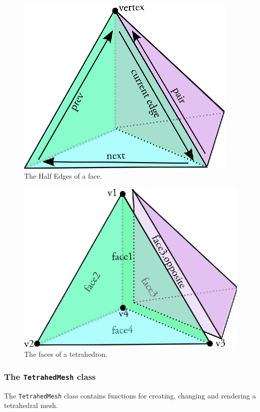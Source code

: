 \documentclass[10pt,a4paper]{article}
\begin{document}
\begin{figure}[htbp]
\label{fig:tetraedge}
\begin{center}
\includegraphics[scale=1]{figures/tetra_edge.eps} 
\caption{The Half Edges of a face.}
\end{center}
\end{figure}

\begin{figure}[htbp]
\label{fig:tetraface}
\begin{center}
\includegraphics[scale=1]{figures/tetra_face.eps} 
\caption{The faces of a tetrahedron.}
\end{center}
\end{figure}


\subsubsection{The \texttt{TetrahedMesh} class}
The \texttt{TetrahedMesh} class contains functions for creating, changing and rendering a tetrahedral mesh.
\end{document}
